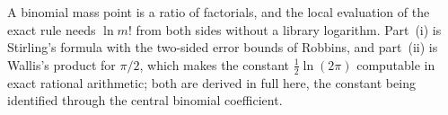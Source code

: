 
A binomial mass point is a ratio of factorials, and the local evaluation of
the exact rule needs $\ln m!$ from both sides without a library logarithm.
Part~(i) is Stirling's formula with the two-sided error bounds of Robbins,
and part~(ii) is Wallis's product for $\pi/2$, which makes the constant
$\tfrac12\ln(2\pi)$ computable in exact rational arithmetic; both are derived
in full here, the constant being identified through the central binomial
coefficient.

